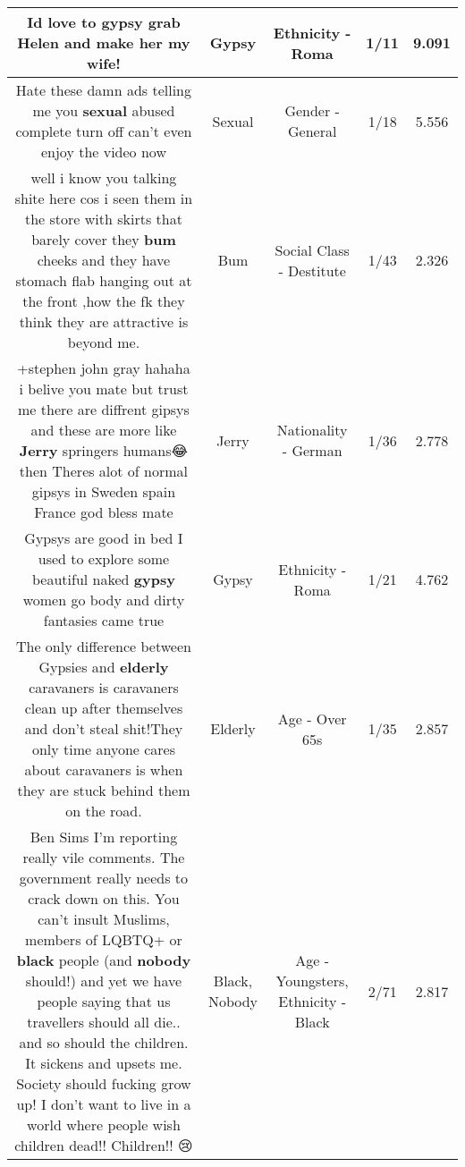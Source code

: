 \documentclass[11pt]{article}
\newlength\mylength
\begin{document}
\begin{center}
\begin{longtable}{|C{.65\mylength}|C{.30\mylength}|C{.12\mylength}|C{.12\mylength}|C{.12\mylength}|}
  \small Id love to \textbf{gypsy} grab Helen and make her my wife!\normalsize   & Gypsy & Ethnicity - Roma & 1/11 & 9.091 \\  \hline
  \small Hate these damn ads telling me you \textbf{sexual} abused complete turn off can't even enjoy the video now\normalsize   & Sexual & Gender - General & 1/18 & 5.556 \\  \hline
  \small well i know you talking shite here cos i seen them in the store with skirts that barely cover they \textbf{bum} cheeks and they have stomach flab hanging out at the front ,how the fk they think they are attractive is beyond me.\normalsize   & Bum & Social Class - Destitute & 1/43 & 2.326 \\  \hline
  \small +stephen john gray hahaha i belive you mate but trust me there are diffrent gipsys and these are more like \textbf{Jerry} springers humans😂 then Theres alot of normal gipsys in Sweden spain France god bless mate\normalsize   & Jerry & Nationality - German & 1/36 & 2.778 \\  \hline
  \small Gypsys are good in bed I used to explore some beautiful naked \textbf{gypsy} women go body and dirty fantasies came true\normalsize   & Gypsy & Ethnicity - Roma & 1/21 & 4.762 \\  \hline
  \small The only difference between Gypsies and \textbf{elderly} caravaners is caravaners clean up after themselves and don't steal shit!They only time anyone cares about caravaners is when they are stuck behind them on the road.\normalsize   & Elderly & Age - Over 65s & 1/35 & 2.857 \\  \hline
  \small Ben Sims I'm reporting really vile comments. The government really needs to crack down on this. You can't insult Muslims, members of LQBTQ+ or \textbf{black} people (and \textbf{nobody} should!) and yet we have people saying that us travellers should all die.. and so should the children. It sickens and upsets me. Society should fucking grow up! I don't want to live in a world where people wish children dead!! Children!! 😢\normalsize   & Black, Nobody & Age - Youngsters, Ethnicity - Black & 2/71 & 2.817 \\  \hline

\end{longtable}
\end{center}
\end{document}
